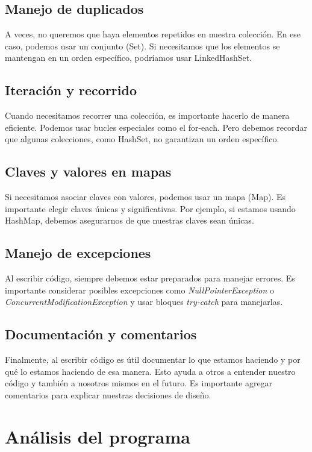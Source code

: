 \documentclass[a4paper,12pt]{article}
\begin{document}
\subsection{Manejo de duplicados}

A veces, no queremos que haya elementos repetidos en nuestra colección. En ese caso, podemos usar un conjunto (Set). Si necesitamos que los elementos se mantengan en un orden específico, podríamos usar LinkedHashSet.

\subsection{Iteración y recorrido}

Cuando necesitamos recorrer una colección, es importante hacerlo de manera eficiente. Podemos usar bucles especiales como el for-each. Pero debemos recordar que algunas colecciones, como HashSet, no garantizan un orden específico.

\subsection{Claves y valores en mapas}

Si necesitamos asociar claves con valores, podemos usar un mapa (Map). Es importante elegir claves únicas y significativas. Por ejemplo, si estamos usando HashMap, debemos asegurarnos de que nuestras claves sean únicas.

\subsection{Manejo de excepciones}

Al escribir código, siempre debemos estar preparados para manejar errores. Es importante considerar posibles excepciones como \textit{NullPointerException} o \textit{ConcurrentModificationException} y usar bloques \textit{try-catch} para manejarlas.

\subsection{Documentación y comentarios}

Finalmente, al escribir código es útil documentar lo que estamos haciendo y por qué lo estamos haciendo de esa manera. Esto ayuda a otros a entender nuestro código y también a nosotros mismos en el futuro. Es importante agregar comentarios para explicar nuestras decisiones de diseño.

\section{Análisis del programa}
\end{document}
